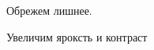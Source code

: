 Обрежем лишнее.

\noindent
\begin{minipage}{\linewidth}
\end{minipage}
\bigskip

Увеличим яроксть и контраст

\noindent
\begin{minipage}{\linewidth}
\end{minipage}
\bigskip


